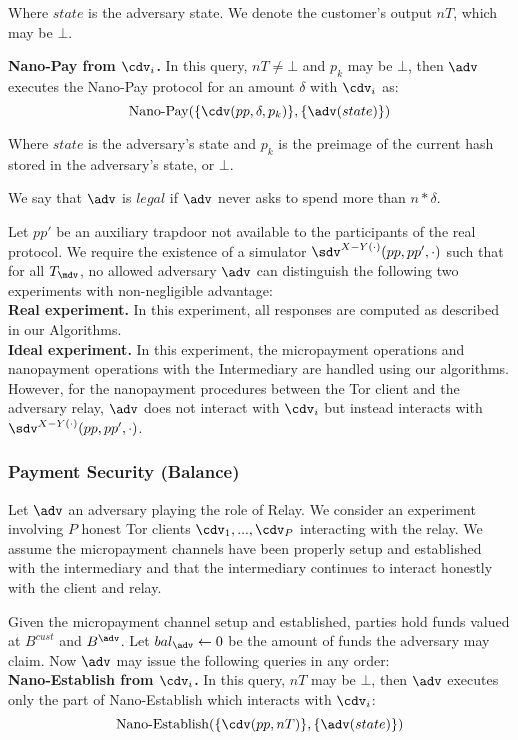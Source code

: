 Where $state$ is the adversary state. We denote the customer's output $nT$, which may be $\bot$.


\textbf{Nano-Pay from $\cdv_i$.} In this query, $nT \neq \bot$ and $p_k$ may be $\bot$, then $\adv$ executes the Nano-Pay protocol for an amount $\delta$ with $\cdv_i$ as:
$$\operatorname{Nano-Pay}(\{\cdv(pp, \delta, p_k)\}, \{\adv(state)\})$$

Where $state$ is the adversary's state and $p_k$ is the preimage of the current hash stored in the adversary's state, or $\bot$.

We say that $\adv$ is $legal$ if $\adv$ never asks to spend more than $n*\delta$.

Let $pp'$ be an auxiliary trapdoor not available to the participants of the real protocol. We require the existence of a simulator $\sdv^{X-Y(\cdot)}(pp, pp', \cdot)$ such that for all $T_\mdv$, no allowed adversary $\adv$ can distinguish the following two experiments with non-negligible advantage:\\
\textbf{Real experiment.} In this experiment, all responses are computed as described in our Algorithms.\\
\textbf{Ideal experiment.} In this experiment, the micropayment operations and nanopayment operations with the Intermediary are handled using our algorithms. However, for the nanopayment procedures between the Tor client and the adversary relay, $\adv$ does not interact with $\cdv_i$ but instead interacts with $\sdv^{X-Y(\cdot)}(pp,pp',\cdot)$.

\subsubsection{Payment Security (Balance)}
\label{def:balance}

Let $\adv$ an adversary playing the role of Relay. We consider an experiment
involving $P$ honest Tor clients $\cdv_1,..., \cdv_P$ interacting with the
relay. We assume the micropayment channels have been properly setup and
established with the intermediary and that the intermediary continues to
interact honestly with the client and relay.

Given the micropayment channel setup and established, parties hold funds valued
at $B^{cust}$ and $B^{\adv}$. Let $bal_\adv \leftarrow 0$ be the amount of funds
the adversary may claim. Now $\adv$ may issue the following queries in any order:\\

\textbf{Nano-Establish from $\cdv_i$.} In this query, $nT$ may be $\bot$, then $\adv$ executes only the part of Nano-Establish which interacts with $\cdv_i$:
$$\operatorname{Nano-Establish}(\{\cdv(pp, nT)\}, \{\adv(state)\})$$

